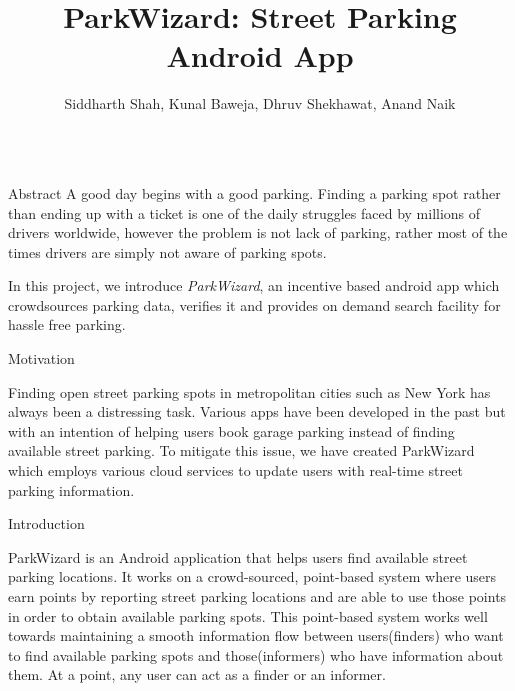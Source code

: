 \documentclass[final]{beamer}
\title{ParkWizard: Street Parking Android App} %
\author{Siddharth Shah, Kunal Baweja, Dhruv Shekhawat, Anand Naik} %
\newlength{\onecolwid}
\begin{document}


\begin{frame}[t] %

\begin{columns}[t] %

\begin{column}{\onecolwid} %

\begin{alertblock}{Abstract}
A good day begins with a good parking. Finding a parking spot rather than ending up with a ticket is one of the daily struggles faced by millions of drivers worldwide, however the problem is not lack of parking, rather most of the times drivers are simply not aware of parking spots.\par
In this project, we introduce \textit{ParkWizard}, an incentive based android app which crowdsources parking data, verifies it and provides on demand search
facility for hassle free parking.
\end{alertblock}


\begin{block}{Motivation}

Finding open street parking spots in metropolitan cities such as New York has always been a distressing task. Various apps have been developed in the past but with an intention of helping users book garage parking instead of finding available street parking. To mitigate this issue, we have created ParkWizard which employs various cloud services to update users with real-time street parking information.
\end{block}


\begin{block}{Introduction}

ParkWizard is an Android application that helps users find available street parking locations. It works on a crowd-sourced, point-based system where users earn points by reporting street parking locations and are able to use those points in order to obtain available parking spots. This point-based system works well towards maintaining a smooth information flow between users(finders) who want to find available parking spots and those(informers) who have information about them. At a point, any user can act as a finder or an informer.\par


\end{block}
\end{column}
\end{columns}
\end{frame}
\end{document}
